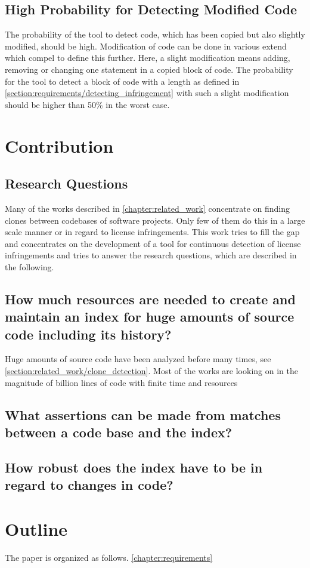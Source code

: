 \subsection{High Probability for Detecting Modified Code}\label{section:requirements/high_probability}
The probability of the tool to detect code, which has been copied but also slightly modified, should be high.
Modification of code can be done in various extend which compel to define this further.
Here, a slight modification means adding, removing or changing one statement in a copied block of code.
The probability for the tool to detect a block of code with a length as defined in \autoref{section:requirements/detecting_infringement} with such a slight modification should be higher than 50\% in the worst case. %


\section{Contribution}
\subsection*{Research Questions}\label{section:introduction/research_questions}
Many of the works described in \autoref{chapter:related_work} concentrate on finding clones between codebases of software projects.
Only few of them do this in a large scale manner or in regard to license infringements.
This work tries to fill the gap and concentrates on the development of a tool for continuous detection of license infringements and tries to answer the research questions, which are described in the following.

\subsection*{How much resources are needed to create and maintain an index for huge amounts of source code including its history?}
Huge amounts of source code have been analyzed before many times, see \ref{section:related_work/clone_detection}.
Most of the works are looking on 
 in the magnitude of billion lines of code 
 with finite time and resources

\subsection*{What assertions can be made from matches between a code base and the index?}
\subsection*{How robust does the index have to be in regard to changes in code?}



\section{Outline}
The paper is organized as follows.
\autoref{chapter:requirements}